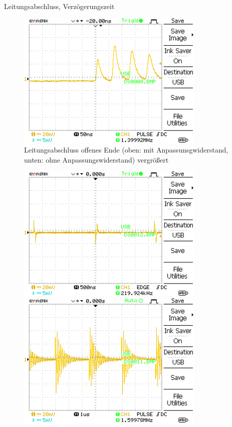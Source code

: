 \documentclass[ngerman]{scrartcl}
\theoremstyle{definition}
\begin{document}
\begin{aufgabe}{Leitungsabschluss, Verzögerungszeit}
\begin{unteraufgabe}
\begin{figure}[H]
					\includegraphics[width=0.8\textwidth]{MesswerteVersuch1/DS0008.png}
					\caption{Leitungsabschluss offenes Ende (oben: mit Anpassunsgwiderstand, unten: ohne Anpassungswiderstand) vergrößert}
					\label{fig:DS0009.8}
				\end{figure}
			\end{unteraufgabe}
			\begin{unteraufgabe}
				\begin{figure}[H]
					\centering
					\includegraphics[width=0.8\textwidth]{MesswerteVersuch1/DS0012.png}
					\includegraphics[width=0.8\textwidth]{MesswerteVersuch1/DS0011.png}

\end{figure}
\end{unteraufgabe}
\end{aufgabe}
\end{document}
